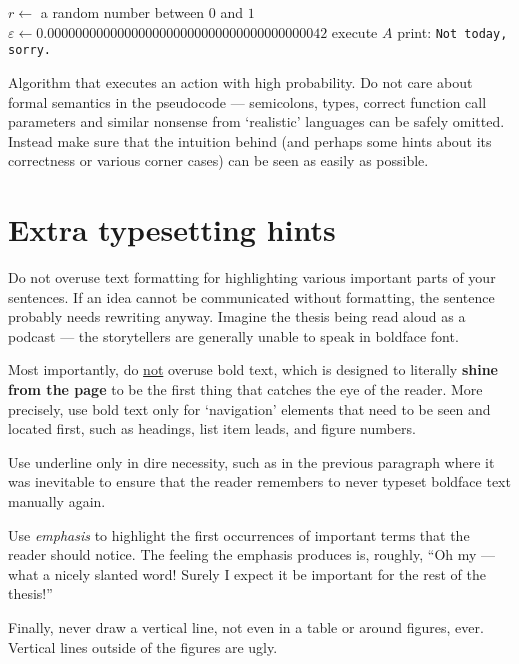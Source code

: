 \begin{algorithm}
\begin{algorithmic}
	\State $r \gets$ a random number between $0$ and $1$
	\State $\varepsilon \gets 0.0000000000000000000000000000000000000042$
		\State execute $A$ 
	\Else
		\State print: \texttt{Not today, sorry.}
	\EndIf
\EndFunction
\end{algorithmic}
\caption{Algorithm that executes an action with high probability. Do not care about formal semantics in the pseudocode --- semicolons, types, correct function call parameters and similar nonsense from `realistic' languages can be safely omitted. Instead make sure that the intuition behind (and perhaps some hints about its correctness or various corner cases) can be seen as easily as possible.}
\label{alg:w}
\end{algorithm}

\section{Extra typesetting hints}

Do not overuse text formatting for highlighting various important parts of your sentences. If an idea cannot be communicated without formatting, the sentence probably needs rewriting anyway. Imagine the thesis being read aloud as a podcast --- the storytellers are generally unable to speak in boldface font.

Most importantly, do \underline{not} overuse bold text, which is designed to literally \textbf{shine from the page} to be the first thing that catches the eye of the reader. More precisely, use bold text only for `navigation' elements that need to be seen and located first, such as headings, list item leads, and figure numbers.

Use underline only in dire necessity, such as in the previous paragraph where it was inevitable to ensure that the reader remembers to never typeset boldface text manually again.

Use \emph{emphasis} to highlight the first occurrences of important terms that the reader should notice. The feeling the emphasis produces is, roughly, ``Oh my --- what a nicely slanted word! Surely I expect it be important for the rest of the thesis!''

Finally, never draw a vertical line, not even in a table or around figures, ever. Vertical lines outside of the figures are ugly.

